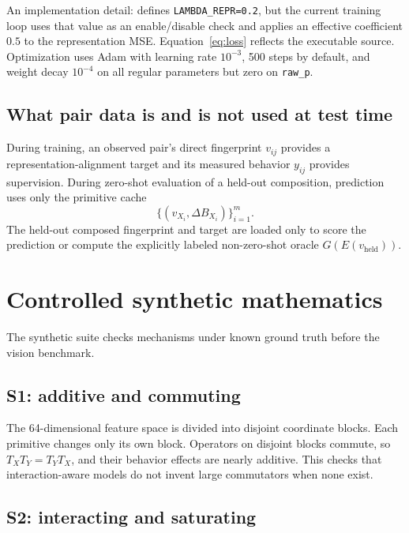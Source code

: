 \documentclass[11pt,a4paper]{article}
\newcommand{\dB}{\Delta B}
\begin{document}
An implementation detail:  defines
\texttt{LAMBDA\_REPR=0.2}, but the current training loop uses that value as an
enable/disable check and applies an effective coefficient $0.5$ to the
representation MSE.  Equation~\eqref{eq:loss} reflects the executable source.
Optimization uses Adam with learning rate $10^{-3}$, 500 steps by default, and
weight decay $10^{-4}$ on all regular parameters but zero on \texttt{raw\_p}.

\subsection{What pair data is and is not used at test time}

During training, an observed pair's direct fingerprint $v_{ij}$ provides a
representation-alignment target and its measured behavior $y_{ij}$ provides
supervision.  During zero-shot evaluation of a held-out composition, prediction
uses only the primitive cache
\[
\{(v_{X_i},\dB_{X_i})\}_{i=1}^m.
\]
The held-out composed fingerprint and target are loaded only to score the
prediction or compute the explicitly labeled non-zero-shot oracle
$G(E(v_{\mathrm{held}}))$.

\section{Controlled synthetic mathematics}

The synthetic suite checks mechanisms under known ground truth before the
vision benchmark.

\subsection{S1: additive and commuting}

The 64-dimensional feature space is divided into disjoint coordinate blocks.
Each primitive changes only its own block.  Operators on disjoint blocks
commute, so $T_XT_Y=T_YT_X$, and their behavior effects are nearly additive.
This checks that interaction-aware models do not invent large commutators when
none exist.

\subsection{S2: interacting and saturating}
\end{document}
